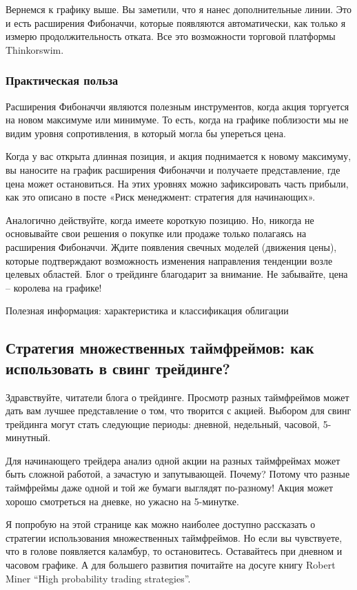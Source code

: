 \documentclass{book}
\begin{document}
Вернемся к графику выше. Вы заметили, что я нанес дополнительные линии. Это и есть расширения Фибоначчи, которые появляются автоматически, как только я измерю продолжительность отката. Все это возможности торговой платформы Thinkorswim.

\subsubsection{Практическая польза}

Расширения Фибоначчи являются полезным инструментов, когда акция торгуется на новом максимуме или минимуме. То есть, когда на графике поблизости мы не видим уровня сопротивления, в который могла бы упереться цена.

Когда у вас открыта длинная позиция, и акция поднимается к новому максимуму, вы наносите на график расширения Фибоначчи и получаете представление, где цена может остановиться. На этих уровнях можно зафиксировать часть прибыли, как это описано в посте «Риск менеджмент: стратегия для начинающих».

Аналогично действуйте, когда имеете короткую позицию. Но, никогда не основывайте свои решения о покупке или продаже только полагаясь на расширения Фибоначчи. Ждите появления свечных моделей (движения цены), которые подтверждают возможность изменения направления тенденции возле целевых областей. Блог о трейдинге благодарит за внимание. Не забывайте, цена – королева на графике!


Полезная информация: характеристика и классификация облигации

\subsection{Стратегия множественных таймфреймов: как использовать в
  свинг трейдинге?}

Здравствуйте, читатели блога о трейдинге. Просмотр разных таймфреймов может дать вам лучшее представление о том, что творится с акцией. Выбором для свинг трейдинга могут стать следующие периоды: дневной, недельный, часовой, 5-минутный.

Для начинающего трейдера анализ одной акции на разных таймфреймах может быть сложной работой, а зачастую и запутывающей. Почему? Потому что разные таймфреймы даже одной и той же бумаги выглядят по-разному! Акция может хорошо смотреться на дневке, но ужасно на 5-минутке.

Я попробую на этой странице как можно наиболее доступно рассказать о
стратегии использования множественных таймфреймов. Но если вы
чувствуете, что в голове появляется каламбур, то
остановитесь. Оставайтесь при дневном и часовом графике. А для
большего развития почитайте на досуге книгу Robert Miner “High
probability trading strategies”.
\end{document}
